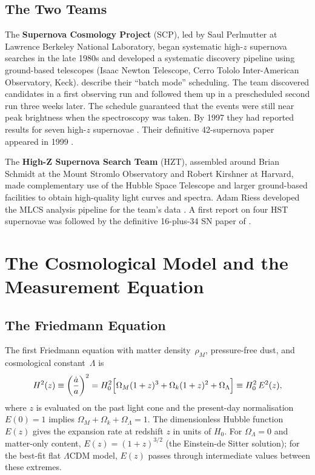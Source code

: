 \documentclass[12pt]{article}
\begin{document}
\subsection{The Two Teams}

The \textbf{Supernova Cosmology Project} (SCP), led by Saul Perlmutter
at Lawrence Berkeley National Laboratory, began systematic high-$z$
supernova searches in the late 1980s and developed a systematic discovery
pipeline using ground-based telescopes (Isaac Newton Telescope, Cerro
Tololo Inter-American Observatory, Keck).
\citet{GoobarPerlmutter1995} describe their ``batch mode'' scheduling.  The
team discovered candidates in a first observing run and followed them up in a
prescheduled second run three weeks later.  The schedule guaranteed that the
events were still near peak brightness when the spectroscopy was taken.  By
1997 they had reported results for seven high-$z$ supernovae
\citep{Perlmutter1997}.  Their definitive 42-supernova paper appeared in 1999
\citep{Perlmutter1999}.

The \textbf{High-Z Supernova Search Team} (HZT), assembled around
Brian Schmidt at the Mount Stromlo Observatory and Robert Kirshner at
Harvard, made complementary use of the Hubble Space Telescope and
larger ground-based facilities to obtain high-quality light curves and
spectra.  Adam Riess developed the MLCS analysis pipeline for the team's
data \citep{RiessPress1996}.  A first report on four HST supernovae
\citep{Garnavich1998} was followed by the definitive 16-plus-34 SN paper
of \citet{Riess1998}.

\section{The Cosmological Model and the Measurement Equation}
\label{sec:model}

\subsection{The Friedmann Equation}

The first Friedmann equation with matter density~$\rho_M$, pressure-free
dust, and cosmological constant~$\Lambda$ is
\begin{equation}\label{eq:friedmann}
  H^2(z) \equiv \left(\frac{\dot a}{a}\right)^2
  = H_0^2\Bigl[\Omega_M(1+z)^3 + \Omega_k(1+z)^2 + \Omega_\Lambda\Bigr]
  \equiv H_0^2\,E^2(z),
\end{equation}
where $z$ is evaluated on the past light cone and the present-day
normalisation $E(0) = 1$ implies $\Omega_M + \Omega_k + \Omega_\Lambda = 1$.
The dimensionless Hubble function $E(z)$ gives the expansion rate at
redshift $z$ in units of $H_0$.  For $\Omega_\Lambda = 0$ and matter-only
content, $E(z) = (1+z)^{3/2}$ (the Einstein-de Sitter solution); for
the best-fit flat $\Lambda$CDM model, $E(z)$ passes through intermediate
values between these extremes.
\end{document}
